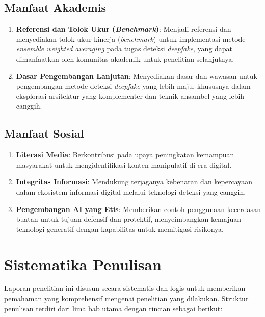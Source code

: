 \subsection{Manfaat Akademis}
\begin{enumerate}
    \item \textbf{Referensi dan Tolok Ukur (\textit{Benchmark})}: Menjadi referensi dan menyediakan tolok ukur kinerja (\textit{benchmark}) untuk implementasi metode \textit{ensemble weighted averaging} pada tugas deteksi \textit{deepfake}, yang dapat dimanfaatkan oleh komunitas akademik untuk penelitian selanjutnya.
    
    \item \textbf{Dasar Pengembangan Lanjutan}: Menyediakan dasar dan wawasan untuk pengembangan metode deteksi \textit{deepfake} yang lebih maju, khususnya dalam eksplorasi arsitektur yang komplementer dan teknik ansambel yang lebih canggih.
\end{enumerate}

\subsection{Manfaat Sosial}
\begin{enumerate}
    \item \textbf{Literasi Media}: Berkontribusi pada upaya peningkatan kemampuan masyarakat untuk mengidentifikasi konten manipulatif di era digital.
    
    \item \textbf{Integritas Informasi}: Mendukung terjaganya kebenaran dan kepercayaan dalam ekosistem informasi digital melalui teknologi deteksi yang canggih.
    
    \item \textbf{Pengembangan AI yang Etis}: Memberikan contoh penggunaan kecerdasan buatan untuk tujuan defensif dan protektif, menyeimbangkan kemajuan teknologi generatif dengan kapabilitas untuk memitigasi risikonya.
\end{enumerate}

\section{Sistematika Penulisan}

Laporan penelitian ini disusun secara sistematis dan logis untuk memberikan pemahaman yang komprehensif mengenai penelitian yang dilakukan. Struktur penulisan terdiri dari lima bab utama dengan rincian sebagai berikut:

